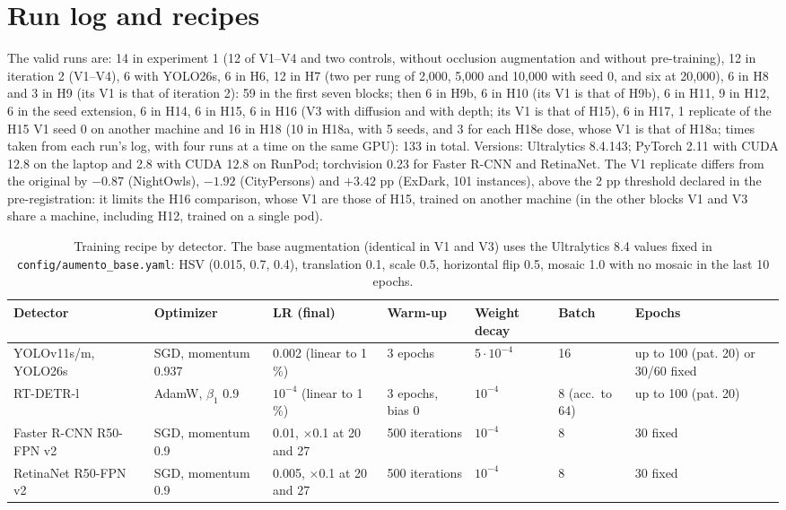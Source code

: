 \documentclass[10pt]{article}
\begin{document}
\section{Run log and recipes}
The valid runs are: 14 in experiment 1 (12 of V1--V4 and two controls, without occlusion augmentation and without pre-training), 12 in iteration 2 (V1--V4), 6 with YOLO26s, 6 in H6, 12 in H7 (two per rung of 2,000, 5,000 and 10,000 with seed 0, and six at 20,000), 6 in H8 and 3 in H9 (its V1 is that of iteration 2): 59 in the first seven blocks; then 6 in H9b, 6 in H10 (its V1 is that of H9b), 6 in H11, 9 in H12, 6 in the seed extension, 6 in H14, 6 in H15, 6 in H16 (V3 with diffusion and with depth; its V1 is that of H15), 6 in H17, 1 replicate of the H15 V1 seed 0 on another machine and 16 in H18 (10 in H18a, with 5 seeds, and 3 for each H18e dose, whose V1 is that of H18a; times taken from each run's log, with four runs at a time on the same GPU): 133 in total. Versions: Ultralytics 8.4.143; PyTorch 2.11 with CUDA 12.8 on the laptop and 2.8 with CUDA 12.8 on RunPod; torchvision 0.23 for Faster R-CNN and RetinaNet. The V1 replicate differs from the original by $-0.87$ (NightOwls), $-1.92$ (CityPersons) and $+3.42$ pp (ExDark, 101 instances), above the 2 pp threshold declared in the pre-registration: it limits the H16 comparison, whose V1 are those of H15, trained on another machine (in the other blocks V1 and V3 share a machine, including H12, trained on a single pod).



\begin{table}[H]\centering\small
\caption{Training recipe by detector. The base augmentation (identical in V1 and V3) uses the Ultralytics 8.4 values fixed in \texttt{config/aumento\_base.yaml}: HSV (0.015, 0.7, 0.4), translation 0.1, scale 0.5, horizontal flip 0.5, mosaic 1.0 with no mosaic in the last 10 epochs.}
\begin{tabular}{@{}p{2.6cm}p{2.2cm}p{2.6cm}p{1.9cm}p{1.6cm}p{1.6cm}p{2.6cm}@{}}\toprule
Detector & Optimizer & LR (final) & Warm-up & Weight decay & Batch & Epochs \\\midrule
YOLOv11s/m, YOLO26s & SGD, momentum 0.937 & 0.002 (linear to 1\,\%) & 3 epochs & $5\cdot10^{-4}$ & 16 & up to 100 (pat. 20) or 30/60 fixed \\
RT-DETR-l & AdamW, $\beta_1$ 0.9 & $10^{-4}$ (linear to 1\,\%) & 3 epochs, bias 0 & $10^{-4}$ & 8 (acc.\ to 64) & up to 100 (pat. 20) \\
Faster R-CNN R50-FPN v2 & SGD, momentum 0.9 & 0.01, $\times$0.1 at 20 and 27 & 500 iterations & $10^{-4}$ & 8 & 30 fixed \\
RetinaNet R50-FPN v2 & SGD, momentum 0.9 & 0.005, $\times$0.1 at 20 and 27 & 500 iterations & $10^{-4}$ & 8 & 30 fixed \\
\bottomrule\end{tabular}\end{table}
\end{document}
